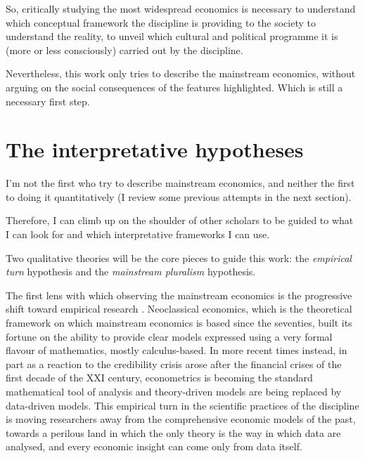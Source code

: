 \documentclass[a4paper, 11pt, headings=standardclasses, tablecaptionsbelow]{scrartcl}
\begin{document}
So, critically studying the most widespread economics is necessary to understand which conceptual framework the discipline is providing to the society to understand the reality, to unveil which cultural and political programme it is (more or less consciously) carried out by the discipline.

Nevertheless, this work only tries to describe the mainstream economics, without arguing on the social consequences of the features highlighted. Which is still a necessary first step.

\section{The interpretative hypotheses}
I'm not the first who try to describe mainstream economics, and neither the first to doing it quantitatively (I review some previous attempts in the next section).

Therefore, I can climb up on the shoulder of other scholars to be guided to what I can look for and which interpretative frameworks I can use.

Two qualitative theories will be the core pieces to guide this work: the \textit{empirical turn} hypothesis and the \textit{mainstream pluralism} hypothesis.

The first lens with which observing the mainstream economics is the progressive shift toward empirical research \parencite{backhouse2000,backhouse2016,backhouse2017,cherrier2022}.
Neoclassical economics, which is the theoretical framework on which mainstream economics is based since the seventies, built its fortune on the ability to provide clear models expressed using a very formal flavour of mathematics, mostly calculus-based.
In more recent times instead, in part as a reaction to the credibility crisis arose after the financial crises of the first decade of the XXI century, econometrics is becoming the standard mathematical tool of analysis and theory-driven models are being replaced by data-driven models.
This empirical turn in the scientific practices of the discipline is moving researchers away from the comprehensive economic models of the past, towards a perilous land in which the only theory is the way in which data are analysed, and every economic insight can come only from data itself.
\end{document}
